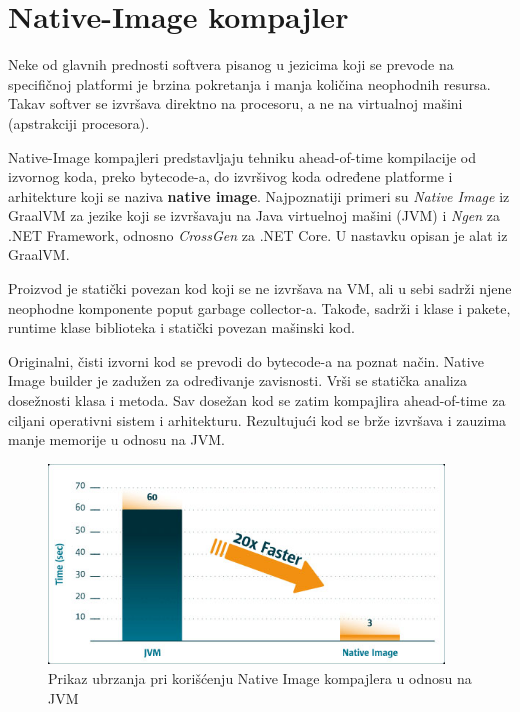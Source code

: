 \documentclass[a4paper]{article}
\begin{document}
\section{Native-Image kompajler}
\label{sec:natImg}

Neke od glavnih prednosti softvera pisanog u jezicima koji se prevode na specifičnoj platformi je
brzina pokretanja i manja količina neophodnih resursa. Takav softver se izvršava direktno na
procesoru, a ne na virtualnoj mašini (apstrakciji procesora).

Native-Image kompajleri predstavljaju tehniku ahead-of-time kompilacije od izvornog koda, preko
bytecode-a, do izvršivog koda određene platforme i arhitekture koji se 
naziva \textbf{native image}. \cite{natImgGraal01}
Najpoznatiji primeri su \textit{Native Image} iz GraalVM za jezike koji se izvršavaju na Java virtuelnoj mašini (JVM) i
\textit{Ngen} za .NET Framework, odnosno \textit{CrossGen} za .NET Core.
U nastavku opisan je alat iz GraalVM.

Proizvod je statički povezan kod koji se ne izvršava na VM, ali u sebi sadrži njene neophodne 
komponente poput garbage collector-a. Takođe, sadrži i klase i pakete,
runtime klase biblioteka i statički povezan mašinski kod. \cite{natImgGraal02}

Originalni, čisti izvorni kod se prevodi do bytecode-a na poznat način.
Native Image builder je zadužen za određivanje zavisnosti. Vrši se statička
analiza dosežnosti klasa i metoda. Sav dosežan kod se zatim 
kompajlira ahead-of-time za ciljani operativni sistem i arhitekturu.
Rezultujući kod se brže izvršava i zauzima manje memorije u odnosu na JVM. 

\begin{figure}[h!]
  \begin{center}
      \includegraphics[width=105mm]{./pics/alibaba_pic.jpg}
  \end{center}
  \caption {Prikaz ubrzanja pri korišćenju Native Image kompajlera u odnosu na JVM}
  \label{fig:natImg-alibaba}
\end{figure}
\end{document}
